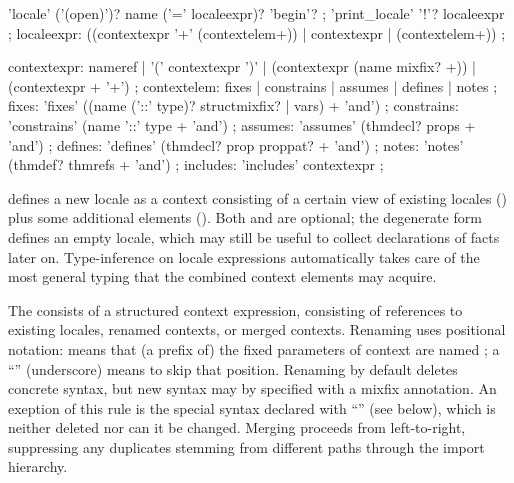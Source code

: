 \begin{isabellebody}
\begin{isamarkuptext}
  \begin{rail}
    'locale' ('(open)')? name ('=' localeexpr)? 'begin'?
    ;
    'print\_locale' '!'? localeexpr
    ;
    localeexpr: ((contextexpr '+' (contextelem+)) | contextexpr | (contextelem+))
    ;

    contextexpr: nameref | '(' contextexpr ')' |
    (contextexpr (name mixfix? +)) | (contextexpr + '+')
    ;
    contextelem: fixes | constrains | assumes | defines | notes
    ;
    fixes: 'fixes' ((name ('::' type)? structmixfix? | vars) + 'and')
    ;
    constrains: 'constrains' (name '::' type + 'and')
    ;
    assumes: 'assumes' (thmdecl? props + 'and')
    ;
    defines: 'defines' (thmdecl? prop proppat? + 'and')
    ;
    notes: 'notes' (thmdef? thmrefs + 'and')
    ;
    includes: 'includes' contextexpr
    ;
  \end{rail}

  \begin{descr}
  
  \item [\mbox{\isa{\isacommand{locale}}}~\isa{{\isachardoublequote}loc\ {\isacharequal}\ import\ {\isacharplus}\ body{\isachardoublequote}}] defines a
  new locale  as a context consisting of a certain view of
  existing locales () plus some additional elements
  ().  Both  and  are optional;
  the degenerate form \mbox{}~ defines an empty
  locale, which may still be useful to collect declarations of facts
  later on.  Type-inference on locale expressions automatically takes
  care of the most general typing that the combined context elements
  may acquire.

  The  consists of a structured context expression,
  consisting of references to existing locales, renamed contexts, or
  merged contexts.  Renaming uses positional notation:  means that (a prefix of) the fixed
  parameters of context  are named ; a ``\isa{{\isacharunderscore}}'' (underscore) means to skip that
  position.  Renaming by default deletes concrete syntax, but new
  syntax may by specified with a mixfix annotation.  An exeption of
  this rule is the special syntax declared with ``\isa{{\isachardoublequote}{\isacharparenleft}{\isasymSTRUCTURE}{\isacharparenright}{\isachardoublequote}}'' (see below), which is neither deleted nor can it
  be changed.  Merging proceeds from left-to-right, suppressing any
  duplicates stemming from different paths through the import
  hierarchy.


\end{descr}
\end{isamarkuptext}
\end{isabellebody}
